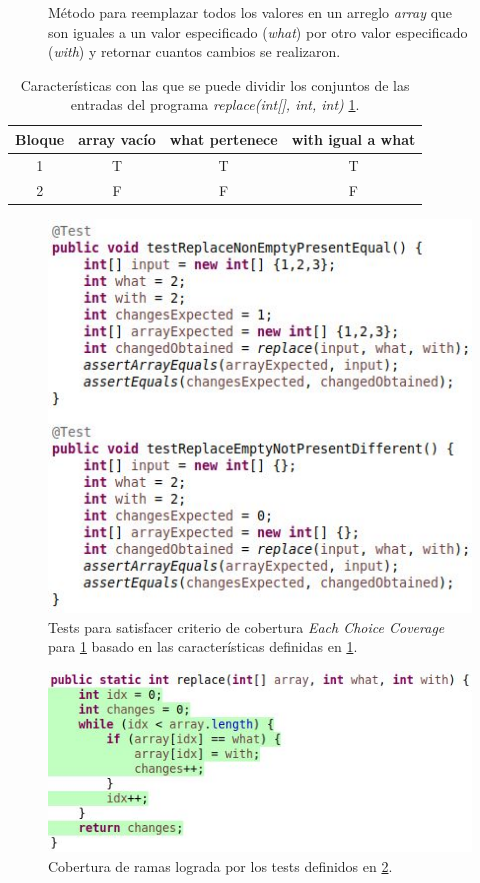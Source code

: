 \begin{figure}
	
	\caption{M\'etodo para reemplazar todos los valores en un arreglo \emph{array} que son iguales a un valor especificado (\emph{what}) por otro valor especificado (\emph{with}) y retornar cuantos cambios se realizaron.}
	\label{figures.code.replaceExample}
\end{figure}

\begin{table}[]
	\centering
	\begin{tabular}{|c|ccc|}
		\hline
		Bloque & array vac\'io & what pertenece & with igual a what \\ \hline
		1 & T & T & T \\ \hline
		2 & F & F & F \\ \hline
	\end{tabular}
	\caption{Caracter\'isticas con las que se puede dividir los conjuntos de las entradas del programa \emph{replace(int[], int, int)} \ref{figures.code.replaceExample}.}
	\label{tables.example.codeCoverage}
\end{table}

\begin{figure}
	\centering
	\includegraphics[width=.90\linewidth]{figures/replaceTestsEachChoice.JPG}
	\caption{Tests para satisfacer criterio de cobertura \emph{Each Choice Coverage} para \ref{figures.code.replaceExample} basado en las caracter\'isticas definidas en \ref{tables.example.codeCoverage}.}
	\label{figures.examples.coverage.eccTests}
\end{figure}

\begin{figure}
	\centering
	\includegraphics[width=\linewidth]{figures/replaceFullCoverage.JPG}
	\caption{Cobertura de ramas lograda por los tests definidos en \ref{figures.examples.coverage.eccTests}.}
	\label{figures.examples.coverage.eccCoverage}
\end{figure}
